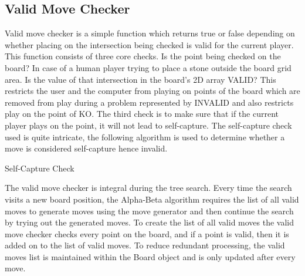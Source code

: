 \documentclass{l4proj}
\begin{document}
\subsection{Valid Move Checker}
Valid move checker is a simple function which returns true or false depending on whether placing on the intersection being checked is valid for the current player. This function consists of three core checks. Is the point being checked on the board? In case of a human player trying to place a stone outside the board grid area. Is the value of that intersection in the board’s 2D array VALID? This restricts the user and the computer from playing on points of the board which are removed from play during a problem represented by INVALID and also restricts play on the point of KO. The third check is to make sure that if the current player plays on the point, it will not lead to self-capture. The self-capture check used is quite intricate, the following algorithm is used to determine whether a move is considered self-capture hence invalid.

\begin{algorithm}[H]
\caption{Self-Capture Check}\label{Self-Capture Check}
    \DontPrintSemicolon
\end{algorithm}

The valid move checker is integral during the tree search. Every time the search visits a new board position, the Alpha-Beta algorithm requires the list of all valid moves to generate moves using the move generator and then continue the search by trying out the generated moves. To create the list of all valid moves the valid move checker checks every point on the board, and if a point is valid, then it is added on to the list of valid moves. To reduce redundant processing, the valid moves list is maintained within the Board object and is only updated after every move.
\end{document}
